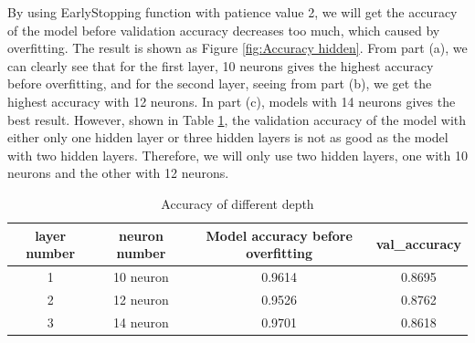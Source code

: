 \documentclass{article}
\begin{document}
\noindent By using EarlyStopping function with patience value 2, we will get the accuracy of the model before validation accuracy decreases too much, which caused by overfitting. The result is shown as Figure \ref{fig:Accuracy  hidden}. From part (a), we can clearly see that for the first layer, 10 neurons gives the highest accuracy before overfitting, and for the second layer, seeing from part (b), we get the highest accuracy with 12 neurons. In part (c), models with 14 neurons gives the best result. However, shown in Table \ref{acc_depth}, the validation accuracy of the model with either only one hidden layer or  three hidden layers is not as good as the model with two hidden layers. Therefore, we will only use two hidden layers, one with 10 neurons and the other with 12 neurons. 
\FloatBarrier
\begin{table}[htb]
\centering
\caption{Accuracy of different depth}
	\begin{tabular}{||c c c c||} 
	 \hline
 	layer number & neuron number& Model accuracy before overfitting & val\_accuracy\\ [0.5ex] 
 	\hline\hline
 	1 & 10 neuron & 0.9614 & 0.8695\\
 	2 & 12 neuron & 0.9526 & 0.8762\\
 	3 & 14 neuron & 0.9701 & 0.8618\\
 	\hline
	\end{tabular}
\label{acc_depth}
\end{table}
\FloatBarrier
\FloatBarrier
\end{document}
